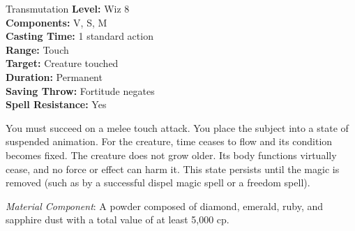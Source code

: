 {Transmutation}
{
	\textbf{Level:}
	Wiz 8\\
	\textbf{Components:}
	V, S, M\\
	\textbf{Casting Time:}
	1 standard action\\
	\textbf{Range:}
	Touch\\
	\textbf{Target:}
	Creature touched\\
	\textbf{Duration:}
	Permanent\\
	\textbf{Saving Throw:}
	Fortitude negates\\
	\textbf{Spell Resistance:}
	Yes\\
}
{
	You must succeed on a melee touch attack. You place the subject into a state of suspended animation. For the creature, time ceases to flow and its condition becomes fixed. The creature does not grow older. Its body functions virtually cease, and no force or effect can harm it. This state persists until the magic is removed (such as by a successful dispel magic spell or a freedom spell).

	\textit{Material Component}:
	A powder composed of diamond, emerald, ruby, and sapphire dust with a total value of at least 5,000 cp.

}
